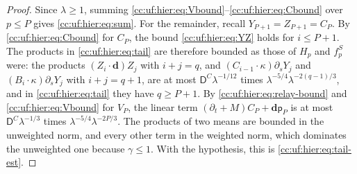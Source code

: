 \begin{proof}
Since $\lambda\ge1$, summing
\eqref{cc:uf:hier:eq:Vbound}--\eqref{cc:uf:hier:eq:Cbound} over
$p\le P$ gives \eqref{cc:uf:hier:eq:sum}. For the remainder,
recall $Y_{P+1}=Z_{P+1}=C_P$. By \eqref{cc:uf:hier:eq:Cbound} for
$C_P$, the bound \eqref{cc:uf:hier:eq:YZ} holds for $i\le P+1$. The
products in \eqref{cc:uf:hier:eq:tail} are therefore bounded as those
of $H_p$ and $f_p^S$ were: the products $(Z_i\cdot\mathbf d)Z_j$ with
$i+j=q$, and $(C_{i-1}\cdot\kappa)\partial_sY_j$ and
$(B_i\cdot\kappa)\partial_sY_j$ with $i+j=q+1$, are at most
$\mathsf D^C\lambda^{-1/12}$ times $\lambda^{-5/4}\lambda^{-2(q-1)/3}$,
and in \eqref{cc:uf:hier:eq:tail} they have $q\ge P+1$. By
\eqref{cc:uf:hier:eq:relay-bound} and \eqref{cc:uf:hier:eq:Vbound} for
$V_P$, the linear term
\((\partial_t+M)C_P+\mathbf d\mathsf p_P\) is at most
$\mathsf D^C\lambda^{-1/3}$ times $\lambda^{-5/4}\lambda^{-2P/3}$. The
products of two means are bounded in the
unweighted norm, and every other term in the weighted norm, which
dominates the unweighted one because $\gamma\le1$. With the hypothesis,
this is \eqref{cc:uf:hier:eq:tail-est}.
\end{proof}
